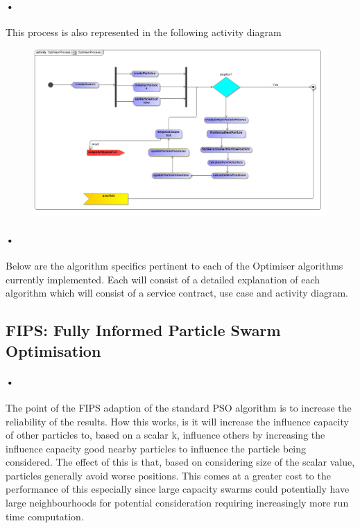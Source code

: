 \documentclass[11pt]{article}
\begin{document}
\paragraph{•}
This process is also represented in the following activity diagram
\begin{figure}[H]
	\includegraphics[scale=0.40]{OptimiserProcess.png}
\end{figure}
\paragraph{•}
Below are the algorithm specifics pertinent to each of the Optimiser algorithms currently implemented. Each will consist of a detailed explanation of each algorithm which will consist of a service contract, use case and activity diagram.
\subsection{FIPS: Fully Informed Particle Swarm Optimisation}
\paragraph{•}
The point of the FIPS adaption of the standard PSO algorithm is to increase the reliability of the results. How this works, is it will increase the influence capacity of other particles to, based on a scalar k, influence others by increasing the influence capacity good nearby particles to influence the particle being considered. The effect of this is that, based on considering size of the scalar value, particles generally avoid worse positions. This comes at a greater cost to the performance of this especially since large capacity swarms could potentially have large neighbourhoods for potential consideration requiring increasingly more run time computation.
\end{document}
